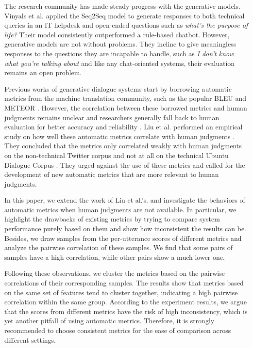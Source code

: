 \documentclass[runningheads]{llncs}
\begin{document}
    The research community has made steady progress with the generative models. Vinyals et al. \cite{GoogleChatbot} applied the Seq2Seq model \cite{Seq2Seq} to generate responses to both technical queries in an IT helpdesk and open-ended questions such as \textit{what's the purpose of life?} Their model consistently outperformed a rule-based chatbot. However, generative models are not without problems. They incline to give meaningless responses to the questions they are incapable to handle, such as \textit{I don't know what you're talking about} and like any chat-oriented systems, their evaluation remains an open problem.

    Previous works of generative dialogue systems start by borrowing automatic metrics from the machine translation community, such as the popular BLEU \cite{BLEU} and METEOR \cite{METEOR}. However, the correlation between these borrowed metrics and human judgments remains unclear and researchers generally fall back to human evaluation for better accuracy and reliability \cite{Shang,DCGM,VHRED}. Liu et al. performed an empirical study on how well these automatic metrics correlate with human judgments \cite{HowNot}. They concluded that the metrics only correlated weakly with human judgments on the non-technical Twitter corpus and not at all on the technical Ubuntu Dialogue Corpus \cite{ubuntu_corpus}. They urged against the use of these metrics and called for the development of new automatic metrics that are more relevant to human judgments.

    In this paper, we extend the work of Liu et al.'s. and investigate the behaviors of automatic metrics when human judgments are not available. In particular, we highlight the drawbacks of existing metrics by trying to compare system performance purely based on them and show how inconsistent the results can be. Besides, we draw samples from the per-utterance scores of different metrics and analyze the pairwise correlation of these samples. We find that some pairs of samples have a high correlation, while other pairs show a much lower one.

    Following these observations, we cluster the metrics based on the pairwise correlations of their corresponding samples. The results show that metrics based on the same set of features tend to cluster together, indicating a high pairwise correlation within the same group. According to the experiment results, we argue that the scores from different metrics have the risk of high inconsistency, which is yet another pitfall of using automatic metrics. Therefore, it is strongly recommended to choose consistent metrics for the ease of comparison across different settings.
\end{document}
